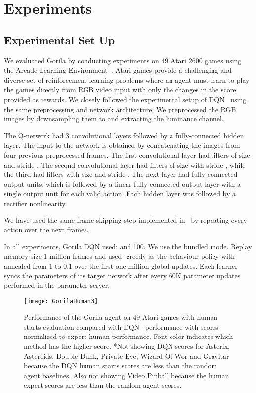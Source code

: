 \documentclass{article}
\begin{document}
 \section{Experiments}
\subsection{Experimental Set Up}
We evaluated Gorila by conducting experiments on 49 Atari 2600 games using the Arcade Learning Environment~\cite{bellemare-ale}.
Atari games provide a challenging and diverse set of reinforcement learning problems where an agent must learn to play the games directly from  RGB video input with only the changes in the score provided as rewards.
We closely followed the experimental setup of DQN~\cite{mnih-dqn-2015} using the same preprocessing and network architecture.
We preprocessed the  RGB images by downsampling them to  and extracting the luminance channel.

The Q-network  had 3 convolutional layers followed by a fully-connected hidden layer.
The  input to the network is obtained by concatenating the images from four previous preprocessed frames.
The first convolutional layer had  filters of size  and stride . The second convolutional layer had  filters of size  with stride , while the third had  filters with size  and stride . The next layer had  fully-connected output units, which is followed by a linear fully-connected output layer with a single output unit for each valid action. 
Each hidden layer was followed by a rectifier nonlinearity.

We have used the same frame skipping step implemented in~\cite{mnih-dqn-2015} by repeating every action  over the next  frames. 

In all experiments, Gorila DQN used:  and  100. We use the bundled mode. Replay memory size  1 million frames and used -greedy as the behaviour policy with  annealed from 1 to 0.1 over the first one million global updates.
Each learner syncs the parameters  of its target network after every 60K parameter updates performed in the parameter server.


\begin{figure*}[!ht]
	\vskip -0.1in
	\begin{center}
		\centerline{\texttt{[image: GorilaHuman3]}}
		\caption{Performance of the Gorila agent on 49 Atari games with human starts evaluation compared with DQN~\cite{mnih-dqn-2015} performance with scores normalized to expert human performance.  Font color indicates which method has the higher score. *Not showing DQN scores for Asterix, Asteroids, Double Dunk, Private Eye, Wizard Of Wor and Gravitar because the DQN human starts scores are less than the random agent baselines. Also not showing Video Pinball because the human expert scores are less than the random agent scores.}
		\label{fig:humanstarts}
	\end{center}
	\vskip -0.2in
\end{figure*}
\end{document}
